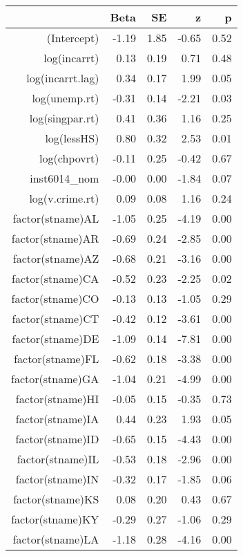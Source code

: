 \begin{table}[ht]
\centering
\begin{tabular}{rrrrr}
  \hline
 & Beta & SE & z & p \\ 
  \hline
(Intercept) & -1.19 & 1.85 & -0.65 & 0.52 \\ 
  log(incarrt) & 0.13 & 0.19 & 0.71 & 0.48 \\ 
  log(incarrt.lag) & 0.34 & 0.17 & 1.99 & 0.05 \\ 
  log(unemp.rt) & -0.31 & 0.14 & -2.21 & 0.03 \\ 
  log(singpar.rt) & 0.41 & 0.36 & 1.16 & 0.25 \\ 
  log(lessHS) & 0.80 & 0.32 & 2.53 & 0.01 \\ 
  log(chpovrt) & -0.11 & 0.25 & -0.42 & 0.67 \\ 
  inst6014\_nom & -0.00 & 0.00 & -1.84 & 0.07 \\ 
  log(v.crime.rt) & 0.09 & 0.08 & 1.16 & 0.24 \\ 
  factor(stname)AL & -1.05 & 0.25 & -4.19 & 0.00 \\ 
  factor(stname)AR & -0.69 & 0.24 & -2.85 & 0.00 \\ 
  factor(stname)AZ & -0.68 & 0.21 & -3.16 & 0.00 \\ 
  factor(stname)CA & -0.52 & 0.23 & -2.25 & 0.02 \\ 
  factor(stname)CO & -0.13 & 0.13 & -1.05 & 0.29 \\ 
  factor(stname)CT & -0.42 & 0.12 & -3.61 & 0.00 \\ 
  factor(stname)DE & -1.09 & 0.14 & -7.81 & 0.00 \\ 
  factor(stname)FL & -0.62 & 0.18 & -3.38 & 0.00 \\ 
  factor(stname)GA & -1.04 & 0.21 & -4.99 & 0.00 \\ 
  factor(stname)HI & -0.05 & 0.15 & -0.35 & 0.73 \\ 
  factor(stname)IA & 0.44 & 0.23 & 1.93 & 0.05 \\ 
  factor(stname)ID & -0.65 & 0.15 & -4.43 & 0.00 \\ 
  factor(stname)IL & -0.53 & 0.18 & -2.96 & 0.00 \\ 
  factor(stname)IN & -0.32 & 0.17 & -1.85 & 0.06 \\ 
  factor(stname)KS & 0.08 & 0.20 & 0.43 & 0.67 \\ 
  factor(stname)KY & -0.29 & 0.27 & -1.06 & 0.29 \\ 
  factor(stname)LA & -1.18 & 0.28 & -4.16 & 0.00 \\ 

\end{tabular}
\end{table}
